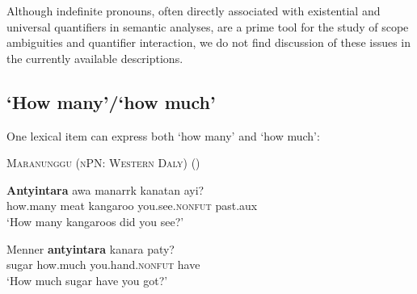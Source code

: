 \documentclass[12pt,egregdoesnotlikesansseriftitles]{scrartcl}
\begin{document}
Although indefinite pronouns, often directly associated with existential and universal quantifiers in semantic analyses, are a prime tool for the study of scope ambiguities and quantifier interaction, we do not find discussion of these issues in the currently available descriptions. %

\subsection{`How many'/`how much'}

One lexical item can express both `how many' and `how much':

\begin{exe}
\ex  \textsc{Maranunggu (nPN: Western Daly)} (\citealt[72]{tryon70})
\begin{xlist}
\ex \gll \textbf{Antyintara}  awa manarrk    kanatan                 ayi?\\
    how.many meat kangaroo you.see.\textsc{nonfut} {\sc past.aux}\\
    `How many kangaroos did you see?'

\ex \gll Menner \textbf{antyintara} kanara                     paty?  \\
    sugar   how.much you.hand.\textsc{nonfut} have \\
    `How much sugar have you got?'
\end{xlist}
\end{exe}

\printbibliography
\end{document}
